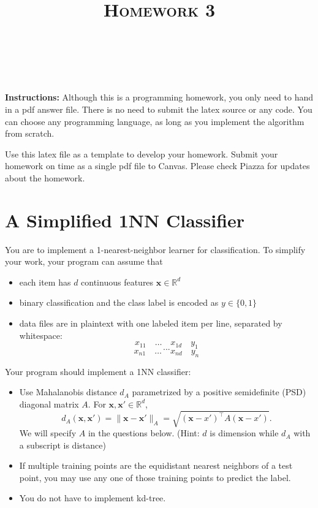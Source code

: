 \documentclass[a4paper]{article}
\title{\textsc{Homework 3}} %
\author{
\red{$$DEEPAN DAS$$} \\
\red{$$ddas27$$}\\
}
\date{}
\theoremstyle{definition}
\newcommand{\RR}{\mathbb{R}}
\def\x{\mathbf x}
\begin{document}
\maketitle 


\textbf{Instructions:} 
Although this is a programming homework, you only need to hand in a pdf answer file.
There is no need to submit the latex source or any code.
You can choose any programming language, as long as you implement the algorithm from scratch. 

Use this latex file as a template to develop your homework.
Submit your homework on time as a single pdf file to Canvas.
Please check Piazza for updates about the homework.

\section{A Simplified 1NN Classifier}
You are to implement a 1-nearest-neighbor learner for classification.
To simplify your work, your program can assume that
\begin{itemize}
\item each item has $d$ continuous features $\x \in \RR^d$
\item binary classification and the class label is encoded as $y \in \{0,1\}$
\item data files are in plaintext with one labeled item per line, separated by whitespace:
$$x_{11} \quad \ldots \quad x_{1d} \quad y_1$$
$$...$$
$$x_{n1} \quad \ldots \quad x_{nd} \quad y_n$$
\end{itemize}

Your program should implement a 1NN classifier: 
\begin{itemize}
\item Use Mahalanobis distance $d_A$ parametrized by a positive semidefinite (PSD) diagonal matrix $A$.  For $\x, \x' \in \RR^d$,
$$d_A(\x,\x') = \|\x-\x'\|_A = \sqrt{(\x-x')^\top A (\x-x')}.$$
We will specify $A$ in the questions below. (Hint: $d$ is dimension while $d_A$ with a subscript is distance)
\item If multiple training points are the equidistant nearest neighbors of a test point, you may use any one of those training points to predict the label.
\item You do not have to implement kd-tree.
\end{itemize}
\end{document}

